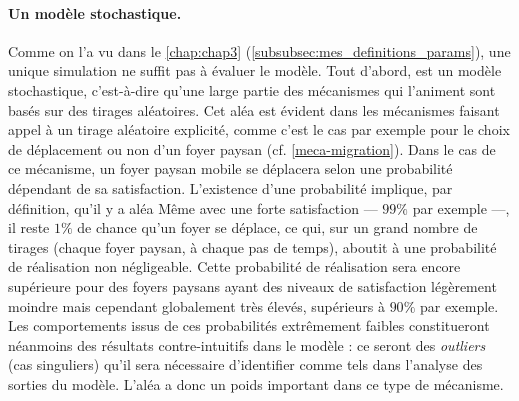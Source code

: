 \paragraph{Un modèle stochastique.}

Comme on l'a vu dans le \cref{chap:chap3} (\cref{subsubsec:mes_definitions_params}), une unique simulation ne suffit pas à évaluer le modèle.
Tout d'abord, \simfeodal{} est un modèle stochastique, c'est-à-dire qu'une large partie des mécanismes qui l'animent sont basés sur des tirages aléatoires.
Cet aléa est évident dans les mécanismes faisant appel à un tirage aléatoire explicité, comme c'est le cas par exemple pour le choix de déplacement ou non d'un foyer paysan (cf. \cref{meca-migration}).
Dans le cas de ce mécanisme, un foyer paysan mobile se déplacera selon une probabilité dépendant de sa satisfaction.
L'existence d'une probabilité implique, par définition, qu'il y a aléa
Même avec une forte satisfaction --- $99\%$ par exemple ---, il reste $1\%$ de chance qu'un foyer se déplace, ce qui, sur un grand nombre de tirages (chaque foyer paysan, à chaque pas de temps), aboutit à une probabilité de réalisation non négligeable.
Cette probabilité de réalisation sera encore supérieure pour des foyers paysans ayant des niveaux de satisfaction légèrement moindre mais cependant globalement très élevés, supérieurs à $90\%$ par exemple.
Les comportements issus de ces probabilités extrêmement faibles constitueront néanmoins des résultats contre-intuitifs dans le modèle : ce seront des \textit{outliers} (cas singuliers) qu'il sera nécessaire d'identifier comme tels dans l'analyse des sorties du modèle.
L'aléa a donc un poids important dans ce type de mécanisme.

